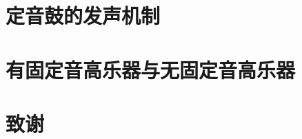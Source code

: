\documentclass[a4paper]{ctexart}
\begin{document}
                                                                                                                                                                                                                                                                                                                                 
	\section{定音鼓的发声机制}
	\section{有固定音高乐器与无固定音高乐器}
	\section{致谢}
	
	
\end{document}
